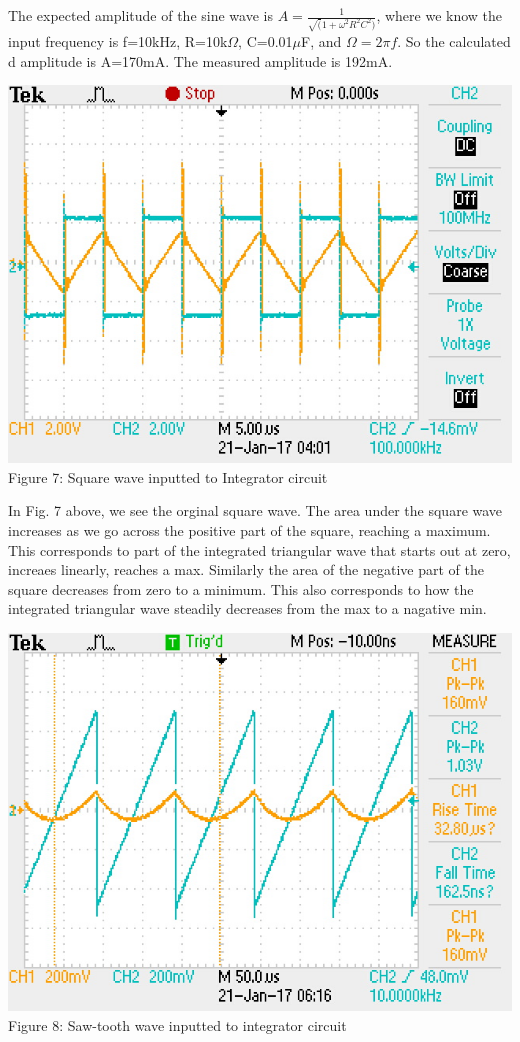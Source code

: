 \documentclass[]{article}
\begin{document}
The expected amplitude of the sine wave is $A=\frac{1}{\sqrt(1+\omega^{2}R^{2}C^{2})}$, where we know the input frequency is f=10kHz, R=10k$\Omega$, C=0.01$\mu $F, and $\Omega=2\pi f$. So the calculated d amplitude is A=170mA. The measured amplitude is 192mA.
\begin{center}
	\includegraphics[scale=0.7]{d_square}\\
	Figure 7: Square wave inputted to Integrator circuit
\end{center}
In Fig. 7 above, we see the orginal square wave. The area under the square wave increases as we go across the positive part of the square, reaching a maximum. This corresponds to part of the integrated triangular wave that starts out at zero, increaes linearly, reaches a max. Similarly the area of the negative part of the square decreases from zero to a minimum.  This also corresponds to how the integrated triangular wave steadily decreases from the max to a nagative min. \\
\begin{center}
	\includegraphics[scale=0.7]{d_sawtooth}\\
	Figure 8: Saw-tooth wave inputted to integrator circuit
\end{center}
\end{document}

